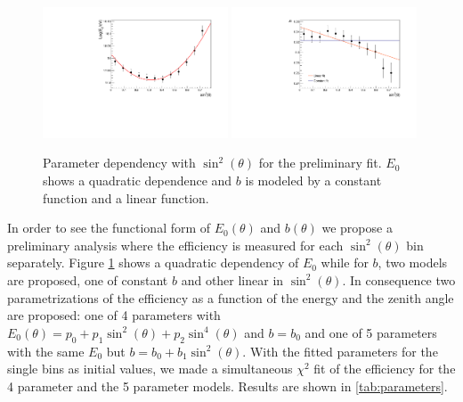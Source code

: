 \documentclass[12pt,a4paper]{article}
\begin{document}
\begin{figure}[h]
    \begin{center}
        \includegraphics[width=0.49\textwidth]{plots/E0.pdf}
        \includegraphics[width=0.49\textwidth]{plots/b.pdf}
        \caption{Parameter dependency with $\sin^2(\theta)$ for the preliminary fit. $E_0$ shows a quadratic dependence and $b$ is modeled by a constant function and a linear function.
        \label{fig:parameters}}
        \vspace{-0.5cm}
    \end{center}
\end{figure} 

In order to see the functional form of $E_0(\theta)$ and $b(\theta)$ we propose a preliminary analysis where the efficiency is measured for each $\sin^2(\theta)$ bin separately. Figure \ref{fig:parameters} shows a quadratic dependency of $E_0$ while for $b$, two models are proposed, one of constant $b$ and other linear in $\sin^2(\theta)$. In consequence two parametrizations of the efficiency as a function of the energy and the zenith angle are proposed: one of 4 parameters with $E_0(\theta)=p_0 + p_1\sin^2(\theta) + p_2\sin^4(\theta)$ and $b=b_0$ and one of 5 parameters with the same $E_0$ but $b=b_0+b_1\sin^2(\theta)$. With the fitted parameters for the single bins as initial values, we made a simultaneous $\chi^2$ fit of the efficiency for the 4 parameter and the 5 parameter models. Results are shown in \cref{tab:parameters}.
\end{document}
